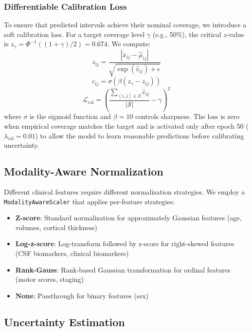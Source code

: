 \documentclass[journal,twoside,web]{ieeecolor}
\begin{document}
\subsubsection{Differentiable Calibration Loss}

To ensure that predicted intervals achieve their nominal coverage, we introduce a soft calibration loss. For a target coverage level $\gamma$ (e.g., 50\%), the critical $z$-value is $z_\gamma = \Phi^{-1}((1+\gamma)/2) = 0.674$. We compute:
\begin{equation}
    z_{ij} = \frac{|\tilde{x}_{ij} - \hat{\mu}_{ij}|}{\sqrt{\exp(\hat{v}_{ij}) + \epsilon}}
\end{equation}
\begin{equation}
    \hat{c}_{ij} = \sigma(\beta(z_\gamma - z_{ij}))
\end{equation}
\begin{equation}
    \mathcal{L}_{\text{cal}} = \left(\frac{\sum_{(i,j) \in \mathcal{S}} \hat{c}_{ij}}{|\mathcal{S}|} - \gamma\right)^2
\end{equation}
where $\sigma$ is the sigmoid function and $\beta = 10$ controls sharpness. The loss is zero when empirical coverage matches the target and is activated only after epoch 50 ($\lambda_{\text{cal}} = 0.01$) to allow the model to learn reasonable predictions before calibrating uncertainty.

\subsection{Modality-Aware Normalization}

Different clinical features require different normalization strategies. We employ a \texttt{ModalityAwareScaler} that applies per-feature strategies:
\begin{itemize}
    \item \textbf{Z-score}: Standard normalization for approximately Gaussian features (age, volumes, cortical thickness)
    \item \textbf{Log-z-score}: Log-transform followed by z-score for right-skewed features (CSF biomarkers, clinical biomarkers)
    \item \textbf{Rank-Gauss}: Rank-based Gaussian transformation for ordinal features (motor scores, staging)
    \item \textbf{None}: Passthrough for binary features (sex)
\end{itemize}

\subsection{Uncertainty Estimation}
\end{document}
